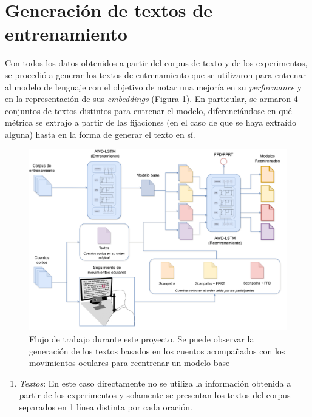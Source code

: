 \section{Generación de textos de entrenamiento}

Con todos los datos obtenidos a partir del corpus de texto y de los experimentos, se procedió a generar los textos de entrenamiento que se utilizaron para entrenar al modelo de lenguaje con el objetivo de notar una mejoría en su \textit{performance} y en la representación de sus \textit{embeddings} (Figura \ref{fig:pipeline}). En particular, se armaron 4 conjuntos de textos distintos para entrenar el modelo, diferenciándose en qué métrica se extrajo a partir de las fijaciones (en el caso de que se haya extraído alguna) hasta en la forma de generar el texto en sí.

\begin{figure}[htb]
    \centering
    \includegraphics[width=1\textwidth]{imagenes/pipeline.png}
    \caption{Flujo de trabajo durante este proyecto. Se puede observar la generación de los textos basados en los cuentos acompañados con los movimientos oculares para reentrenar un modelo base}
    \label{fig:pipeline}
\end{figure}

\begin{enumerate}
    \item \textit{Textos}: En este caso directamente no se utiliza la información obtenida a partir de los experimentos y solamente se presentan los textos del corpus separados en 1 línea distinta por cada oración.
\end{enumerate}

